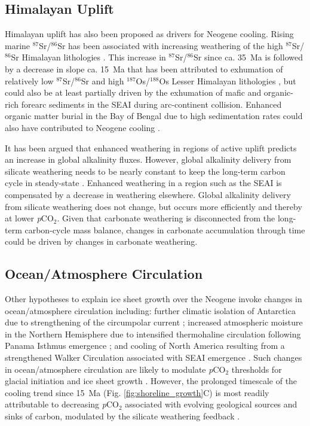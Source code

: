 \documentclass[9pt,twocolumn,twoside,lineno]{pnas-new}
\newcommand{\SrSr}{$^{87}$Sr/$^{86}$Sr\xspace}
\newcommand{\OsOs}{$^{187}$Os/$^{188}$Os\xspace}
\newcommand{\pCOtwo}{\textit{p}CO$_{2}$\xspace}
\begin{document}
\subsection*{Himalayan Uplift}

Himalayan uplift \cite{Raymo1992a, Galy2007a} has also been proposed as drivers for Neogene cooling. Rising marine \SrSr has been associated with increasing weathering of the high \SrSr Himalayan lithologies \cite{Raymo1992a}. This increase in \SrSr since ca. 35~Ma is followed by a decrease in slope ca. 15~Ma that has been attributed to exhumation of relatively low \SrSr and high \OsOs Lesser Himalayan lithologies \cite{Quade1997a, Colleps2018a}, but could also be at least partially driven by the exhumation of mafic and organic-rich forearc sediments in the SEAI during arc-continent collision. Enhanced organic matter burial in the Bay of Bengal due to high sedimentation rates could also have contributed to Neogene cooling \cite{Galy2007a}.

It has been argued that enhanced weathering in regions of active uplift predicts an increase in global alkalinity fluxes. However, global alkalinity delivery from silicate weathering needs to be nearly constant to keep the long-term carbon cycle in steady-state \cite{Kump1997a}. Enhanced weathering in a region such as the SEAI is compensated by a decrease in weathering elsewhere. Global alkalinity delivery from silicate weathering does not change, but occurs more efficiently and thereby at lower \pCOtwo. Given that carbonate weathering is disconnected from the long-term carbon-cycle mass balance, changes in carbonate accumulation through time \cite{Si2019a} could be driven by changes in carbonate weathering.

\subsection*{Ocean/Atmosphere Circulation}

Other hypotheses to explain ice sheet growth over the Neogene invoke changes in ocean/atmosphere circulation including: further climatic isolation of Antarctica due to strengthening of the circumpolar current \cite{Shevenell2004a}; increased atmospheric moisture in the Northern Hemisphere due to intensified thermohaline circulation following Panama Isthmus emergence \cite{Haug1998a}; and cooling of North America resulting from a strengthened Walker Circulation associated with SEAI emergence \cite{Molnar2015a}. Such changes in ocean/atmosphere circulation are likely to modulate \pCOtwo thresholds for glacial initiation and ice sheet growth \cite{DeConto2008a}. However, the prolonged timescale of the cooling trend since 15~Ma (Fig. \ref{fig:shoreline_growth}C) is most readily attributable to decreasing \pCOtwo associated with evolving geological sources and sinks of carbon, modulated by the silicate weathering feedback \cite{Walker1981a, Raymo1991a, Berner1997a, Kump1997a, Berner2001a}.
\end{document}
